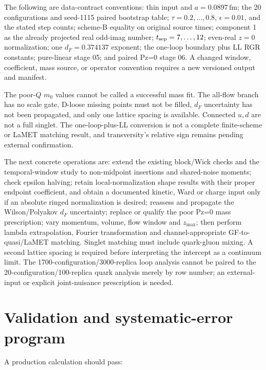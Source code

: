 \documentclass[11pt]{article}
\numberwithin{equation}{section}
\begin{document}
The following are data-contract conventions: thin input and
\(a=0.0897\,\mathrm{fm}\); the 20 configurations and seed-1115 paired
bootstrap table; \(\tau=0.2,\ldots,0.8\), \(\epsilon=0.01\), and the stated
step counts; scheme-B equality on original source times; component 1 as
the already projected real odd-imag number; \(t_{\rm sep}=7,\ldots,12\);
even-real \(z=0\) normalization; one \(d_F=0.374137\) exponent; the
one-loop boundary plus LL RGR constants; pure-linear stage 05; and paired
Pz=0 stage 06.  A changed window, coefficient, mass source, or operator
convention requires a new versioned output and manifest.

The poor-\(Q\) \(m_0\) values cannot be called a successful mass fit.
The all-flow branch has no scale gate, D-loose missing points must not be
filled, \(d_F\) uncertainty has not been propagated, and only one lattice
spacing is available.  Connected \(u,d\) are not a full singlet.  The
one-loop-plus-LL conversion is not a complete finite-scheme or LaMET
matching result, and transversity's relative sign remains pending external
confirmation.

The next concrete operations are: extend the existing block/Wick checks
and the temporal-window study to non-midpoint insertions and shared-noise
moments; check epsilon halving; retain local-normalization shape results
with their proper endpoint coefficient, and obtain a documented kinetic,
Ward or charge input only if an absolute ringed normalization is desired;
reassess and propagate the Wilson/Polyakov \(d_F\) uncertainty;
replace or qualify the poor Pz=0 mass prescription; vary momentum, volume,
flow window and \(z_{\max}\); then perform lambda extrapolation, Fourier
transformation and channel-appropriate GF-to-quasi/LaMET matching.  Singlet
matching must include quark-gluon mixing.  A second lattice spacing is
required before interpreting the intercept as a continuum limit.
The 1700-configuration/3000-replica loop analysis cannot be paired to
the 20-configuration/100-replica quark analysis merely by row number;
an external-input or explicit joint-nuisance prescription is needed.

\clearpage
\section{Validation and systematic-error program}

A production calculation should pass:
\end{document}
